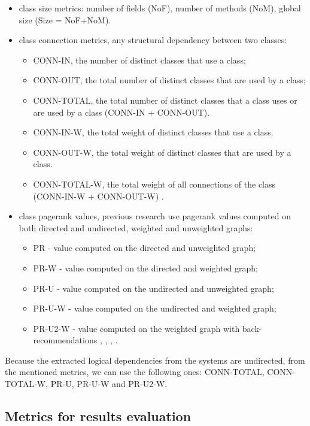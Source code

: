 \documentclass[12pt]{mitthesis}
\begin{document}
\begin{itemize}
	\item class size metrics: number of fields (NoF),  number of methods (NoM), global size (Size = NoF+NoM).
	\item class connection metrics, any structural dependency between two classes:
		\begin{itemize}
			\item CONN-IN, the number of distinct classes that use a class;
			\item CONN-OUT, the total number of distinct classes that are used by a class;
			\item CONN-TOTAL, the total number of distinct classes that a class uses or are used by a class (CONN-IN + CONN-OUT).
			\item CONN-IN-W, the total weight of distinct classes that use a class. 
			\item CONN-OUT-W, the total weight of distinct classes that are used by a class. 
			\item CONN-TOTAL-W, the total weight of all connections of the class (CONN-IN-W + CONN-OUT-W) \cite{Finding-key-classes}.
		\end{itemize}
	\item class pagerank values, previous research use pagerank values computed on both directed and undirected, weighted and unweighted graphs:
		\begin{itemize}
			\item PR - value computed on the directed and unweighted graph;
			\item PR-W - value computed on the directed and weighted graph;
			\item PR-U - value computed on the undirected and unweighted graph;
			\item PR-U-W - value computed on the undirected and weighted graph;
			\item PR-U2-W - value computed on the weighted graph with back-recommendations \cite{PagerankENASE}, \cite{enase15}, \cite{Finding-key-classes}, \cite{PagerankSACI}.
		\end{itemize}
\end{itemize}

Because the extracted logical dependencies from the systems are undirected, from the mentioned metrics, we can use the following ones:  CONN-TOTAL, CONN-TOTAL-W, PR-U, PR-U-W and PR-U2-W.

\subsection{Metrics for results evaluation}
\end{document}

